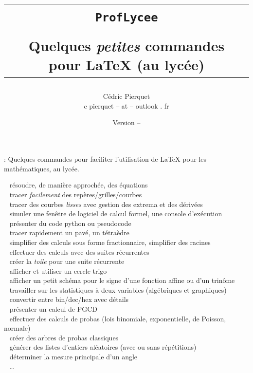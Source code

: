 \documentclass[a4paper,french,11pt]{article}
\title{%
\begin{minipage}{0.85\linewidth}
	\begin{tcolorbox}[colframe=yellow,colback=yellow!15]
		\begin{center}
			\begin{tabular}{c}
				\lstinline!ProfLycee!\\
				\\
				Quelques \textit{petites} commandes pour  \LaTeX{} (au lycée)
			\end{tabular}
		\end{center}
	\end{tcolorbox}
\end{minipage}
}
\author{
	\begin{tabular}{c}
		Cédric Pierquet\\
		{\ttfamily c pierquet -- at -- outlook . fr}
	\end{tabular}
}
\date{Version \PLversion{} -- \PLdate}
\newcommand\deblst{{\tiny\faCode}~}
\begin{document}
\pagestyle{fancy}

\maketitle

\thispagestyle{empty}

{ : Quelques commandes pour faciliter l'utilisation de \LaTeX{} pour les mathématiques, au lycée.}

\medskip

{\small\noindent%
{\deblst} résoudre, de manière approchée, des équations\\
{\deblst} tracer \textit{facilement} des repères/grilles/courbes\\
{\deblst} tracer  des courbes \textit{lisses} avec gestion des extrema et des dérivées\\
{\deblst} simuler une fenêtre de logiciel de calcul formel, une console d'exécution \\
{\deblst} présenter du code \textsf{python} ou \textsf{pseudocode} \\
{\deblst} tracer rapidement un pavé, un tétraèdre \\
{\deblst} simplifier des calculs sous forme fractionnaire, simplifier des racines \\
{\deblst} effectuer des calculs avec des suites récurrentes \\
{\deblst} créer la \textit{toile} pour une suite récurrente \\
{\deblst} afficher et utiliser un cercle trigo \\
{\deblst} afficher un petit schéma pour le signe d'une fonction affine ou d'un trinôme \\
{\deblst} travailler sur les statistiques à deux variables (algébriques et graphiques) \\
{\deblst} convertir entre bin/dec/hex avec détails \\
{\deblst} présenter un calcul de PGCD \\
{\deblst} effectuer des calculs de probas (lois binomiale, exponentielle, de Poisson, normale) \\
{\deblst} créer des arbres de probas \og classiques \fg \\
{\deblst} générer des listes d'entiers aléatoires (avec ou sans répétitions)\\
{\deblst} déterminer la mesure principale d'un angle \\
{\deblst} \ldots}
\end{document}
